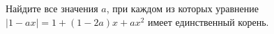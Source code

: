 \begin{ex}
	\begin{condition}
		Найдите все значения \( a \), при каждом из которых уравнение \( |1-ax|=1+(1-2a)x+ax^2 \) имеет единственный корень.
	\end{condition}
\end{ex}